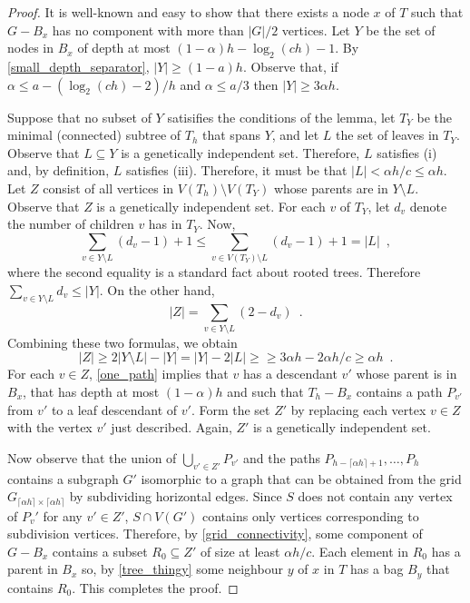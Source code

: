 \documentclass{patmorin}
\begin{document}
\begin{proof}
  It is well-known and easy to show that there exists a node $x$ of $T$ such that $G-B_x$ has no component with more than $|G|/2$ vertices.  Let $Y$ be the set of nodes in $B_x$ of depth at most $(1-\alpha)h-\log_2(ch)-1$. By \cref{small_depth_separator}, $|Y|\ge (1-a)h$.  Observe that, if $\alpha \le a-(\log_2(ch)-2)/h$ and $\alpha \le a/3$ then $|Y|\ge 3\alpha h$.

  Suppose that no subset of $Y$ satisifies the conditions of the lemma, let $T_Y$ be the minimal (connected) subtree of $T_h$ that spans $Y$, and let $L$ the set of leaves in $T_Y$.  Observe that $L\subseteq Y$ is a genetically independent set. Therefore, $L$ satisfies (i) and, by definition, $L$ satisfies (iii).  Therefore, it must be that $|L|<\alpha h/c\le\alpha h$.  Let $Z$ consist of all vertices in $V(T_h)\setminus V(T_Y)$ whose parents are in $Y\setminus L$.   Observe that $Z$ is a genetically independent set. For each $v$ of $T_Y$, let $d_v$ denote the number of children $v$ has in $T_Y$.  Now,
  \[
     \sum_{v\in Y\setminus L} (d_v-1) + 1 
     \le \sum_{v\in V(T_Y)\setminus L} (d_v-1)+1
     = |L| \enspace ,
  \]
  where the second equality is a standard fact about rooted trees.
  Therefore $\sum_{v\in Y\setminus L} {d_v} \le |Y|$.  On the other hand,
  \[
    |Z| = \sum_{v\in Y\setminus L} (2-d_v) \enspace .
  \]
  Combining these two formulas, we obtain
  \[
    |Z| \ge 2|Y\setminus L| - |Y| = |Y| - 2|L| \ge 
    \ge 3\alpha h - 2\alpha h/c \ge \alpha h \enspace .
  \]
  For each $v\in Z$, \cref{one_path} implies that $v$ has a descendant $v'$ whose parent is in $B_x$, that has depth at most $(1-\alpha)h$ and such that $T_h-B_x$ contains a path $P_{v'}$ from $v'$ to a leaf descendant of $v'$.  Form the set $Z'$ by replacing each vertex $v\in Z$ with the vertex $v'$ just described.  Again, $Z'$ is a genetically independent set.

  Now observe that the union of $\bigcup_{v'\in Z'} P_{v'}$ and the paths $P_{h-\lceil\alpha h\rceil+1},\ldots,P_{h}$ contains a subgraph $G'$ isomorphic to a graph that can be obtained from the grid $G_{\lceil\alpha h\rceil\times\lceil\alpha h\rceil}$ by subdividing horizontal edges.  Since $S$ does not contain any vertex of $P_v'$ for any $v'\in Z'$,  $S\cap V(G')$ contains only vertices corresponding to subdivision vertices.  Therefore, by \cref{grid_connectivity}, some component of $G-B_x$ contains a subset $R_0\subseteq Z'$ of size at least $\alpha h/c$.  Each element in $R_0$ has a parent in $B_x$ so, by \cref{tree_thingy} some neighbour $y$ of $x$ in $T$ has a bag $B_y$ that contains $R_0$.  This completes the proof.
\end{proof}
\end{document}
